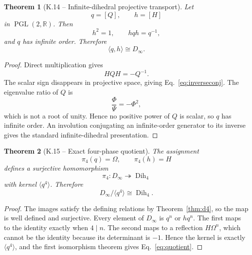 \documentclass[11pt,letterpaper]{article}
\theoremstyle{kernelstyle}
\newtheorem{theorem}{Theorem}[section]
\newcommand{\R}{\mathbb{R}}
\newcommand{\PGL}{\operatorname{PGL}}
\newcommand{\Dih}{\operatorname{Dih}}
\begin{document}
\begin{theorem}[K.14 -- Infinite-dihedral projective transport]\label{thm:dinf}
Let
\[
q=[Q],
\qquad
h=[H]
\]
in $\PGL(2,\R)$.  Then
\begin{equation}\label{eq:inverseconj}
h^2=1,
\qquad
hqh=q^{-1},
\end{equation}
and $q$ has infinite order.  Therefore
\begin{equation}
\langle q,h\rangle\cong D_\infty.
\end{equation}
\end{theorem}

\begin{proof}
Direct multiplication gives
\begin{equation}\label{eq:hqh}
HQH=-Q^{-1}.
\end{equation}
The scalar sign disappears in projective space, giving Eq.~\eqref{eq:inverseconj}.  The eigenvalue ratio of $Q$ is
\[
\frac{\Phi}{\Psi}=-\Phi^2,
\]
which is not a root of unity.  Hence no positive power of $Q$ is scalar, so $q$ has infinite order.  An involution conjugating an infinite-order generator to its inverse gives the standard infinite-dihedral presentation.
\end{proof}

\begin{theorem}[K.15 -- Exact four-phase quotient]\label{thm:quotient}
The assignment
\begin{equation}
\pi_4(q)=\Omega,
\qquad
\pi_4(h)=H
\end{equation}
defines a surjective homomorphism
\begin{equation}
\pi_4:D_\infty\twoheadrightarrow\Dih_4
\end{equation}
with kernel $\langle q^4\rangle$.  Therefore
\begin{equation}\label{eq:quotient}
D_\infty/\langle q^4\rangle\cong\Dih_4.
\end{equation}
\end{theorem}

\begin{proof}
The images satisfy the defining relations by Theorem~\ref{thm:d4}, so the map is well defined and surjective.  Every element of $D_\infty$ is $q^n$ or $hq^n$.  The first maps to the identity exactly when $4\mid n$.  The second maps to a reflection $H\Omega^n$, which cannot be the identity because its determinant is $-1$.  Hence the kernel is exactly $\langle q^4\rangle$, and the first isomorphism theorem gives Eq.~\eqref{eq:quotient}.
\end{proof}
\end{document}
